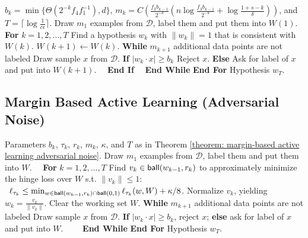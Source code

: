 \documentclass[11pt]{article}
\newcommand{\cD}{\mathcal{D}}
\newcommand{\ball}{\textup{\textsf{ball}}}
\begin{document}
{{{{\begin{algorithm}[ht]
\caption{Margin Based Active Learning under S-Concave Distributions (Realizable Case)}
\begin{algorithmic}
\label{algorithm: margin based active learning realizable case}
 $b_k=\min\{\Theta(2^{-k}f_4f_1^{-1}),d\}$, $m_k=C\left(\frac{f_3b_{k-1}}{2^{-k}}\left(n\log \frac{f_3b_{k-1}}{2^{-k}}+\log \frac{1+s-k}{\delta}\right)\right)$, and $T=\lceil\log \frac{1}{c\epsilon}\rceil$.
 Draw $m_1$ examples from $\cD$, label them and put them into $W(1)$.
 \textbf{For} $k=1,2,...,T$
 \quad Find a hypothesis $w_k$ with $\|w_k\|=1$ that is consistent with $W(k)$.
 \quad $W(k+1)\leftarrow W(k)$.
 \quad \textbf{While} $m_{k+1}$ additional data points are not labeled
 \quad \quad Draw sample $x$ from $\cD$.
 \quad \quad \textbf{If} $|w_k\cdot x|\ge b_k$
 \quad \quad \quad Reject $x$.
 \quad \quad \textbf{Else}
 \quad \quad \quad Ask for label of $x$ and put into $W(k+1)$.
 \quad \ \ \textbf{End If}
 \ \ \textbf{End While}
 \textbf{End For}
 Hypothesis $w_T$.
\end{algorithmic}
\end{algorithm}


\subsection{Margin Based Active Learning (Adversarial Noise)}

\begin{algorithm}[h]
\caption{Margin Based Active Learning under S-Concave Distributions (Adversarial Noise)}
\begin{algorithmic}
 Parameters $b_k$, $\tau_k$, $r_k$, $m_k$, $\kappa$, and $T$ as in Theorem \ref{theorem: margin-based active learning adversarial noise}.
 Draw $m_1$ examples from $\cD$, label them and put them into $W$.
 \ \ \textbf{For} $k=1,2,...,T$
 \quad Find $v_k\in \ball(w_{k-1},r_k)$ to approximately minimize the hinge loss over $W$ s.t. $\|v_k\|\le 1$:\\
\qquad\ $\ell_{\tau_k}\le \min_{w\in \ball(w_{k-1},r_k)\cap \ball(0,1)} \ell_{\tau_k}(w,W)+\kappa/8$.
 \quad Normalize $v_k$, yielding $w_k=\frac{v_k}{\|v_k\|}$.
 \quad Clear the working set $W$.
 \quad \textbf{While} $m_{k+1}$ additional data points are not labeled
 \quad \quad Draw sample $x$ from $\cD$.
 \quad \quad \textbf{If} $|w_k\cdot x|\ge b_k$, reject $x$; \textbf{else} ask for label of $x$ and put into $W$.
 \ \ \ \ \textbf{End While}
 \textbf{End For}
 Hypothesis $w_T$.
\end{algorithmic}
\end{algorithm}


}}}}
\end{document}
